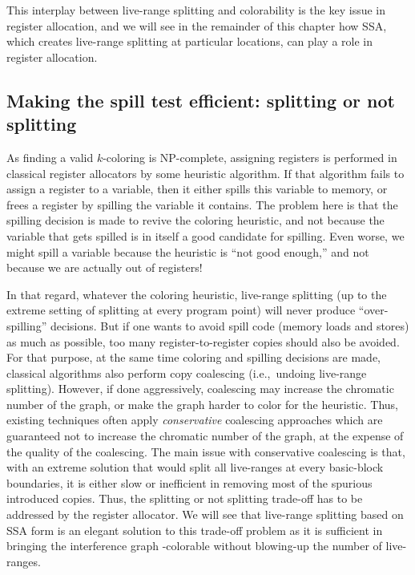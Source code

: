 {This interplay between live-range splitting and colorability is the key issue in register allocation, and we will see in the remainder of this chapter how SSA, which creates live-range splitting at particular locations, can play a role in register allocation.



\subsection{Making the spill test efficient: splitting or not splitting}
As finding a valid $k$-coloring is NP-complete, assigning registers is performed in classical register allocators by some heuristic algorithm.
If that algorithm fails to assign a register to a variable, then it either spills this variable to memory, or frees a register by spilling the variable it contains.
The problem here is that the spilling decision is made to revive the coloring heuristic, and not because the variable that gets spilled is in itself a good candidate for spilling. 
Even worse, we might spill a variable because the heuristic is ``not good enough,'' and not because we are actually out of registers!

In that regard, whatever the coloring heuristic, live-range splitting (up to the extreme setting of splitting at every program point) will never produce ``over-spilling'' decisions.
But if one wants to avoid spill code (memory loads and stores) as much as possible, too many register-to-register copies should also be avoided.
For that purpose, at the same time coloring and spilling decisions are made, classical algorithms also perform copy coalescing (i.e.,~undoing live-range splitting).
However, if done aggressively, coalescing may increase the chromatic number of the graph, or make the graph harder to color for the heuristic.
Thus, existing techniques often apply \emph{conservative} coalescing approaches which are guaranteed not to increase the chromatic number of the graph, at the expense of the quality of the coalescing.
The main issue with conservative coalescing is that, with an extreme solution that would split all live-ranges at every basic-block boundaries, it is either slow or inefficient in removing most of the spurious introduced copies.
Thus, the splitting or not splitting trade-off has to be addressed by the register allocator.
We will see that live-range splitting based on SSA form is an elegant solution to this trade-off problem as it is sufficient in bringing the interference graph \maxlive-colorable without blowing-up the number of live-ranges.

}
